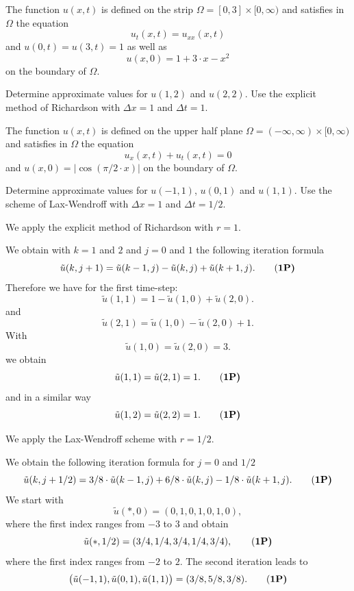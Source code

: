 \begin{teilaufgaben}
\item
The function $u(x,t)$ is defined on the strip
$\Omega = [0,3] \times [0,\infty)$ and
satisfies in $\Omega$ the equation
\[
u_{t}(x,t) = u_{xx}(x,t)
\]
and  $u(0,t) = u(3,t) = 1$ as well as
\[
u(x,0) = 1 + 3 \cdot x - x^2
\]
on the boundary of $\Omega$.

Determine approximate values for $u(1,2)$ and $u(2,2)$.
Use the explicit method of Richardson with $\Delta x = 1$ and $\Delta t = 1$.

\item
The function $u(x,t)$ is defined on the upper half plane
$\Omega = (-\infty, \infty) \times [0,\infty)$ and
satisfies in $\Omega$ the equation
\[
u_{x}(x,t) + u_{t}(x,t) = 0
\]
and $u(x,0) = |\cos(\pi/2 \cdot x)|$ on the boundary of $\Omega$. 

Determine approximate values for $u(-1,1)$, $u(0,1)$ and $u(1,1)$.
Use the scheme of Lax-Wendroff with $\Delta x = 1$ and $\Delta t = 1/2.$
\end{teilaufgaben}

\begin{loesung}
\begin{teilaufgaben}
\item
We apply the explicit method of Richardson with $r = 1$. 

We obtain with $k = 1$ and $2$ and $j = 0$ and $1$ the following iteration
formula
\begin{equation}
\tilde u(k,j+1)
=
\tilde u(k-1,j) - \tilde u(k,j) + \tilde u(k+1,j).
\tag{\bf{1P}}
\end{equation}
Therefore we have for the first time-step:
\[
\tilde u(1,1)
=
1 - \tilde u(1,0) + \tilde u(2,0).
\]
and
\[
\tilde u(2,1)
=
\tilde u(1,0) - \tilde u(2,0) + 1.
\]
With
\[
\tilde u(1,0) = \tilde u(2,0)
=
3.
\]
we obtain
\begin{equation}
\tilde u(1,1) = \tilde u(2,1) = 1.
\tag{\bf{1P}}
\end{equation}
and in a similar way
\begin{equation}
\tilde u(1,2) = \tilde u(2,2) = 1.
\tag{\bf{1P}}
\end{equation}
\item
We apply the Lax-Wendroff scheme with $r = 1/2$. 

We obtain the following iteration formula for $j = 0$ and $1/2$
\begin{equation}
\tilde u(k, j+1/2)
=
3/8 \cdot \tilde u(k-1,j) + 6/8 \cdot \tilde u(k,j) - 1/8
\cdot
\tilde u(k+1,j).
\tag{\bf{1P}}
\end{equation}
We start with
\[
\tilde u(*,0) = (0, 1, 0, 1, 0, 1, 0),
\]
where the first index ranges from $-3$ to $3$ and obtain
\begin{equation}
\tilde u(*,1/2) = (3/4, 1/4, 3/4, 1/4, 3/4),
\tag{\bf{1P}}
\end{equation}
where the first index ranges from $-2$ to $2$.
The second iteration leads to
\begin{equation}
\big(\tilde u(-1,1), \tilde u(0,1), \tilde u(1,1)\big)
=
(3/8, 5/8, 3/8).
\tag{\bf{1P}}
\end{equation}
\end{teilaufgaben}
\end{loesung}
